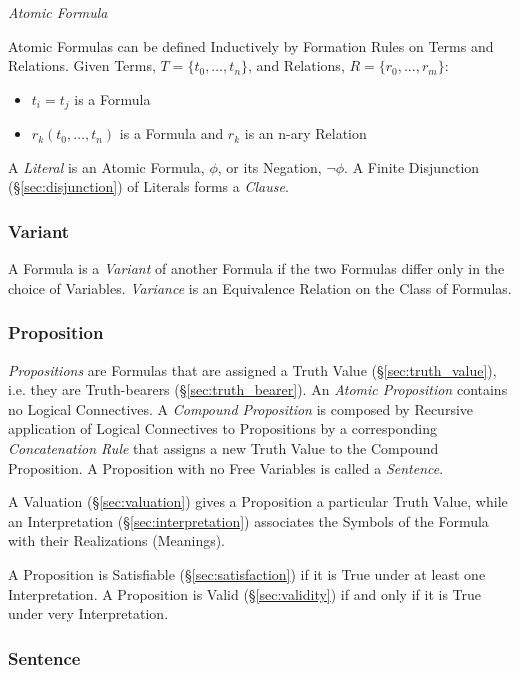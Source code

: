 \emph{Atomic Formula}

Atomic Formulas can be defined Inductively by Formation Rules on Terms
and Relations. Given Terms, $T = \{t_0,\ldots,t_n\}$, and Relations,
$R = \{r_0,\ldots,r_m\}$:
\begin{itemize}
\item $t_i = t_j$ is a Formula
\item $r_k(t_0,\ldots,t_n)$ is a Formula and $r_k$ is an n-ary Relation
\end{itemize}
A \emph{Literal} is an Atomic Formula, $\phi$, or its Negation, $\neg
\phi$. A Finite Disjunction (\S\ref{sec:disjunction}) of Literals
forms a \emph{Clause}.



\subsubsection{Variant}\label{sec:variant}

A Formula is a \emph{Variant} of another Formula if the two Formulas
differ only in the choice of Variables. \emph{Variance} is an
Equivalence Relation on the Class of Formulas.



\subsubsection{Proposition}\label{sec:proposition}

\emph{Propositions} are Formulas that are assigned a Truth Value
(\S\ref{sec:truth_value}), i.e. they are Truth-bearers
(\S\ref{sec:truth_bearer}). An \emph{Atomic Proposition} contains no
Logical Connectives. A \emph{Compound Proposition} is composed by
Recursive application of Logical Connectives to Propositions by a
corresponding \emph{Concatenation Rule} that assigns a new Truth Value
to the Compound Proposition. A Proposition with no Free Variables is
called a \emph{Sentence}.

A Valuation (\S\ref{sec:valuation}) gives a Proposition a particular
Truth Value, while an Interpretation (\S\ref{sec:interpretation})
associates the Symbols of the Formula with their Realizations
(Meanings).

A Proposition is Satisfiable (\S\ref{sec:satisfaction}) if it is True
under at least one Interpretation. A Proposition is Valid
(\S\ref{sec:validity}) if and only if it is True under very
Interpretation.



\subsubsection{Sentence}\label{sec:sentence}



